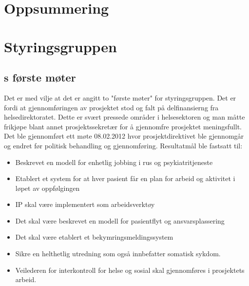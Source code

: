\documentclass[11pt]{report} %
\begin{document}
                \section{Oppsummering}\label{sec:m_sum}  
                  
                \section{Styringsgruppen}\label{sec:m_stygr}
                  \subsection{s første møter}\label{sec:stygr_1}
                 Det er med vilje at det er angitt to "første møter" for styringsgruppen. Det er fordi at gjennomføringen av prosjektet stod og falt på delfinansierng fra helsedirektoratet. Dette er svært pressede områder i helsesektoren og man måtte frikjøpe blant annet prosjektssekretær for å gjennomfre prosjektet meningsfullt. \\
                 Det ble gjennomført ett møte 08.02.2012 hvor prosjektdirektivet\cite{ProPlan-1} ble gjennomgår og endret før politisk behandling og gjennomføring. Resultatmål ble fastsatt til:
                  \begin{itemize}
                  \item Beskrevet en modell for enhetlig jobbing i rus og psykiatritjeneste\\
                  \item Etablert et system for at hver pasient får en plan for arbeid og aktivitet i løpet av oppfølgingen\\
                  \item IP skal være implementert som arbeidsverktøy\\
                  \item Det skal være beskrevet en modell for pasientflyt og ansvarsplassering\\
                  \item Det skal være etablert et bekymringsmeldingssystem\\
                  \item Sikre en helthetlig utredning som også innbefatter somatisk sykdom.\\
                  \item Veilederen for interkontroll for helse og sosial skal gjennomføres i prosjektets arbeid.\\
                  \end{itemize}
\end{document}
